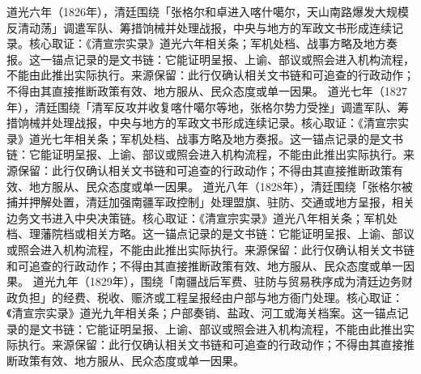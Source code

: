 道光六年（1826年），清廷围绕「张格尔和卓进入喀什噶尔，天山南路爆发大规模反清动荡」调遣军队、筹措饷械并处理战报，中央与地方的军政文书形成连续记录。核心取证：《清宣宗实录》道光六年相关条；军机处档、战事方略及地方奏报。这一锚点记录的是文书链：它能证明呈报、上谕、部议或照会进入机构流程，不能由此推出实际执行。来源保留：此行仅确认相关文书链和可追查的行政动作；不得由其直接推断政策有效、地方服从、民众态度或单一因果。
道光七年（1827年），清廷围绕「清军反攻并收复喀什噶尔等地，张格尔势力受挫」调遣军队、筹措饷械并处理战报，中央与地方的军政文书形成连续记录。核心取证：《清宣宗实录》道光七年相关条；军机处档、战事方略及地方奏报。这一锚点记录的是文书链：它能证明呈报、上谕、部议或照会进入机构流程，不能由此推出实际执行。来源保留：此行仅确认相关文书链和可追查的行政动作；不得由其直接推断政策有效、地方服从、民众态度或单一因果。
道光八年（1828年），清廷围绕「张格尔被捕并押解处置，清廷加强南疆军政控制」处理盟旗、驻防、交通或地方呈报，相关边务文书进入中央决策链。核心取证：《清宣宗实录》道光八年相关条；军机处档、理藩院档或相关方略。这一锚点记录的是文书链：它能证明呈报、上谕、部议或照会进入机构流程，不能由此推出实际执行。来源保留：此行仅确认相关文书链和可追查的行政动作；不得由其直接推断政策有效、地方服从、民众态度或单一因果。
道光九年（1829年），围绕「南疆战后军费、驻防与贸易秩序成为清廷边务财政负担」的经费、税收、赈济或工程呈报经由户部与地方衙门处理。核心取证：《清宣宗实录》道光九年相关条；户部奏销、盐政、河工或海关档案。这一锚点记录的是文书链：它能证明呈报、上谕、部议或照会进入机构流程，不能由此推出实际执行。来源保留：此行仅确认相关文书链和可追查的行政动作；不得由其直接推断政策有效、地方服从、民众态度或单一因果。
